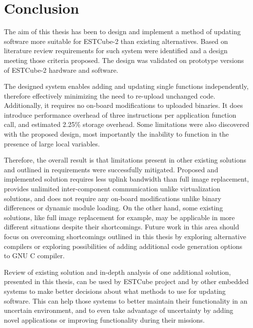 \clearpage
\section{Conclusion}
\label{s:conclusion}

The aim of this thesis has been to design and implement a method of updating software more suitable for ESTCube-2 than existing alternatives. Based on literature review requirements for such system were identified and a design meeting those criteria proposed. The design was validated on prototype versions of ESTCube-2 hardware and software.

The designed system enables adding and updating single functions independently, therefore effectively minimizing the need to re-upload unchanged code. Additionally, it requires no on-board modifications to uploaded binaries. It does introduce performance overhead of three instructions per application function call, and estimated 2.25\% storage overhead. Some limitations were also discovered with the proposed design, most importantly the inability to function in the presence of large local variables.

Therefore, the overall result is that limitations present in other existing solutions and outlined in requirements were successfully mitigated. Proposed and implemented solution requires less uplink bandwidth than full image replacement, provides unlimited inter-component communication unlike virtualization solutions, and does not require any on-board modifications unlike binary differences or dynamic module loading. On the other hand, some existing solutions, like full image replacement for example, may be applicable in more different situations despite their shortcomings. Future work in this area should focus on overcoming shortcomings outlined in this thesis by exploring alternative compilers or exploring possibilities of adding additional code generation options to GNU C compiler.

Review of existing solution and in-depth analysis of one additional solution, presented in this thesis, can be used by ESTCube project and by other embedded systems to make better decisions about what methods to use for updating software. This can help those systems to better maintain their functionality in an uncertain environment, and to even take advantage of uncertainty by adding novel applications or improving functionality during their missions.
